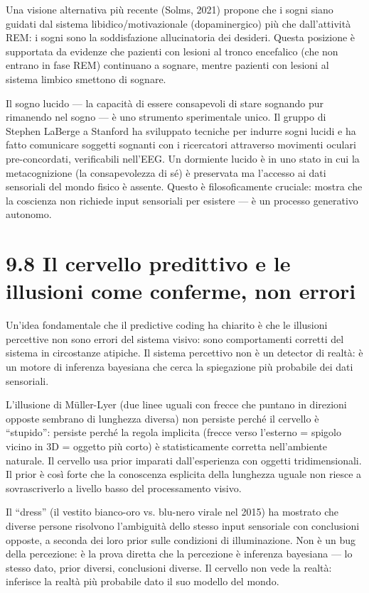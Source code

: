 \documentclass[11.5pt,a4paper,openany]{book}
\theoremstyle{remark}
\begin{document}
Una visione alternativa più recente (Solms, 2021) propone che i sogni siano guidati dal sistema libidico/motivazionale (dopaminergico) più che dall'attività REM: i sogni sono la soddisfazione allucinatoria dei desideri. Questa posizione è supportata da evidenze che pazienti con lesioni al tronco encefalico (che non entrano in fase REM) continuano a sognare, mentre pazienti con lesioni al sistema limbico smettono di sognare.

Il sogno lucido --- la capacità di essere consapevoli di stare sognando pur rimanendo nel sogno --- è uno strumento sperimentale unico. Il gruppo di Stephen LaBerge a Stanford ha sviluppato tecniche per indurre sogni lucidi e ha fatto comunicare soggetti sognanti con i ricercatori attraverso movimenti oculari pre-concordati, verificabili nell'EEG. Un dormiente lucido è in uno stato in cui la metacognizione (la consapevolezza di sé) è preservata ma l'accesso ai dati sensoriali del mondo fisico è assente. Questo è filosoficamente cruciale: mostra che la coscienza non richiede input sensoriali per esistere --- è un processo generativo autonomo.

\section{9.8 Il cervello predittivo e le illusioni come conferme, non errori}

Un'idea fondamentale che il predictive coding ha chiarito è che le illusioni percettive non sono errori del sistema visivo: sono comportamenti corretti del sistema in circostanze atipiche. Il sistema percettivo non è un detector di realtà: è un motore di inferenza bayesiana che cerca la spiegazione più probabile dei dati sensoriali.

L'illusione di Müller-Lyer (due linee uguali con frecce che puntano in direzioni opposte sembrano di lunghezza diversa) non persiste perché il cervello è ``stupido'': persiste perché la regola implicita (frecce verso l'esterno = spigolo vicino in 3D = oggetto più corto) è statisticamente corretta nell'ambiente naturale. Il cervello usa prior imparati dall'esperienza con oggetti tridimensionali. Il prior è così forte che la conoscenza esplicita della lunghezza uguale non riesce a sovrascriverlo a livello basso del processamento visivo.

Il ``dress'' (il vestito bianco-oro vs. blu-nero virale nel 2015) ha mostrato che diverse persone risolvono l'ambiguità dello stesso input sensoriale con conclusioni opposte, a seconda dei loro prior sulle condizioni di illuminazione. Non è un bug della percezione: è la prova diretta che la percezione è inferenza bayesiana --- lo stesso dato, prior diversi, conclusioni diverse. Il cervello non vede la realtà: inferisce la realtà più probabile dato il suo modello del mondo.
\end{document}
